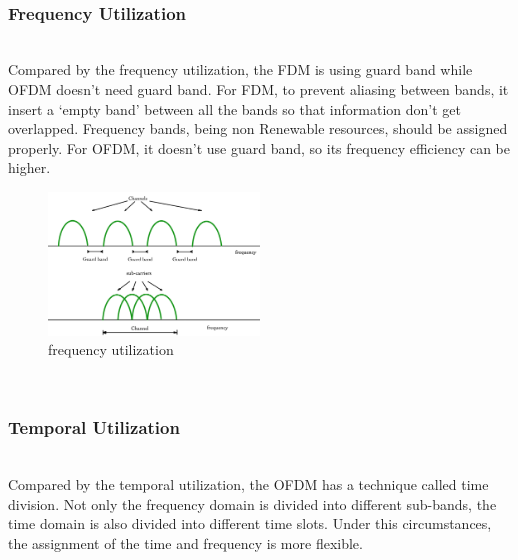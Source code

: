 \documentclass[twocolumn,conference]{IEEEtran}
\begin{document}
    \hfill\\\subsubsection{Frequency Utilization}\hfill\\
    \indent Compared by the frequency utilization, the FDM is using guard band while OFDM doesn’t need guard band. For FDM, to prevent aliasing between bands, it insert a ‘empty band’ between all the bands so that information don’t get overlapped. Frequency bands,  being non Renewable resources, should be assigned properly. For OFDM, it doesn’t use guard band, so its frequency efficiency can be higher.
    \begin{figure}[h]
        \centering
        \includegraphics[width=0.5\textwidth]{./asset/freq}
        \caption{frequency utilization}
        \label{fig:frequency utilization}
    \end{figure}

    \hfill\\\subsubsection{Temporal Utilization}\hfill\\
    \indent Compared by the temporal utilization, the OFDM has a technique called time division. Not only the frequency domain is divided into different sub-bands, the time domain is also divided into different time slots. Under this circumstances, the assignment of the time and frequency is more flexible.
\end{document}
